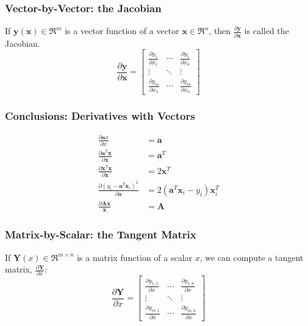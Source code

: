 \documentclass{beamer}
\begin{document}
\begin{frame}
  \frametitle{Vector-by-Vector: the Jacobian}

  If $\mathbf{y}(\mathbf{x})\in\Re^m$ is a vector function of a vector
  $\mathbf{x}\in\Re^n$, then
  $\frac{\partial\mathbf{y}}{\partial\mathbf{x}}$ is called the
  Jacobian.
  \begin{displaymath}
    \frac{\partial\mathbf{y}}{\partial\mathbf{x}}=
    \left[\begin{array}{ccc}
        \frac{\partial y_1}{\partial x_1} & \cdots & \frac{\partial y_1}{\partial x_n}\\
        \vdots&\ddots&\vdots\\
        \frac{\partial y_m}{\partial x_1} & \cdots & \frac{\partial y_m}{\partial x_n}
      \end{array}\right]
  \end{displaymath}        
\end{frame}

\begin{frame}
  \frametitle{Conclusions: Derivatives with Vectors}
  \begin{align*}
    \frac{\partial \mathbf{a}x}{\partial x} &= \mathbf{a}\\
    \frac{\partial \mathbf{a}^T\mathbf{x}}{\partial\mathbf{x}} &= \mathbf{a}^T\\
    \frac{\partial \mathbf{x}^T\mathbf{x}}{\partial\mathbf{x}} &= 2\mathbf{x}^T\\
    \frac{\partial (y_i-\mathbf{a}^T\mathbf{x}_i)^2}{\partial\mathbf{a}}
    &= 2(\mathbf{a}^T\mathbf{x}_i-y_i)\mathbf{x}_i^T\\
    \frac{\partial\mathbf{A}\mathbf{x}}{\mathbf{x}}
    &= \mathbf{A}
  \end{align*}    
\end{frame}

\begin{frame}
  \frametitle{Matrix-by-Scalar: the Tangent Matrix}

  If $\mathbf{Y}(x)\in\Re^{m\times n}$ is a matrix function of a scalar $x$,
  we can compute a tangent matrix,
  $\frac{\partial\mathbf{Y}}{\partial x}$:
  \begin{displaymath}
    \frac{\partial\mathbf{Y}}{\partial x} =
    \left[\begin{array}{ccc}
        \frac{\partial y_{1,1}}{\partial x}&\cdots&\frac{\partial y_{1,n}}{\partial x}\\
        \vdots&\ddots&\vdots\\
        \frac{\partial y_{m,1}}{\partial x}&\cdots&\frac{\partial y_{m,n}}{\partial x}
      \end{array}\right]
  \end{displaymath}
\end{frame}
\end{document}
